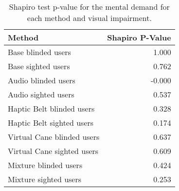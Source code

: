 
\begin{table}[!htb]
\centering
\caption{Shapiro test p-value for the mental demand for each method and visual impairment.}
\label{tab:shapiro_mental_demand}
\begin{tabular}{lr}
\toprule
                    Method &  Shapiro P-Value \\
\midrule
        Base blinded users &            1.000 \\
        Base sighted users &            0.762 \\
       Audio blinded users &           -0.000 \\
       Audio sighted users &            0.537 \\
 Haptic Belt blinded users &            0.328 \\
 Haptic Belt sighted users &            0.174 \\
Virtual Cane blinded users &            0.637 \\
Virtual Cane sighted users &            0.609 \\
     Mixture blinded users &            0.424 \\
     Mixture sighted users &            0.253 \\
\bottomrule
\end{tabular}
\end{table}

